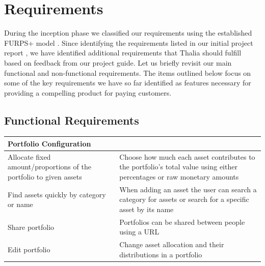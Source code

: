 \documentclass[main.tex]{subfiles}
\begin{document}
\section{Requirements}
During the inception phase we classified our requirements using the established FURPS+ model \cite{FURPS}. Since identifying the requirements listed in our initial project report \cite{TR}, we have identified additional requirements that Thalia should fulfill based on feedback from our project guide. Let us briefly revisit our main functional and non-functional requirements. The items outlined below focus on some of the key requirements we have so far identified as features necessary for providing a compelling product for paying customers.

\subsection{Functional Requirements}
 
{
\setlength{\tabcolsep}{30pt}
\renewcommand{\arraystretch}{2}
\centering
{}
\begin{tabularx}{\linewidth}{|X|X|}
\hline
 \textbf{Portfolio Configuration}  &  \\
 \hline
 Allocate fixed amount/proportions of the portfolio to given assets & Choose how much each asset contributes to the portfolio's total value using either percentages or raw monetary amounts \\
\hline
Find assets quickly by category or name & When adding an asset the user can search a category for assets or search for a specific asset by its name \\
\hline
Share portfolio & Portfolios can be shared between people using a URL \\
\hline
Edit portfolio & Change asset allocation and their distributions in a portfolio \\
\hline
\end{tabularx}
}
\end{document}
